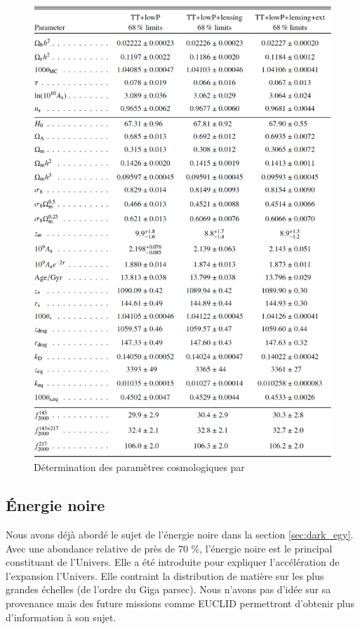 

\begin{figure}[bth]
        \includegraphics[width=.95\linewidth]{img/01/table_planck2.pdf} 
        \caption[Tables paramètres cosmologique]{Détermination des paramètres cosmologiques par \cite{planck_collaboration_planck_2016} }
 		\label{fig:planck_parameters}
\end{figure}



\subsection{Énergie noire}
Nous avons déjà abordé le sujet de l'énergie noire dans la section \ref{sec:dark_egy}.
Avec une abondance relative de près de 70 \%, l'énergie noire est le principal constituant de l'Univers.
Elle a été introduite pour expliquer l'accélération de l'expansion l'Univers.
Elle contraint la distribution de matière sur les plus grandes échelles (de l'ordre du Giga parsec).
Nous n'avons pas d'idée sur sa provenance mais des future missions comme EUCLID \citep{2016PhRvD..94l3515T} permettront d'obtenir plus d'information à son sujet.

